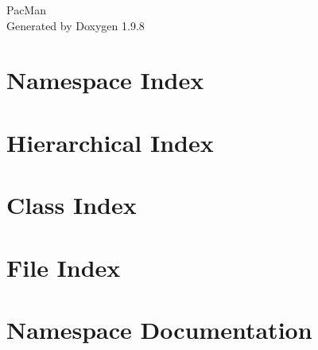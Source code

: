 \documentclass[twoside]{book}
\newcommand{\+}{\discretionary{\mbox{\scriptsize$\hookleftarrow$}}{}{}}
\newcommand{\clearemptydoublepage}{%
    \newpage{\pagestyle{empty}\cleardoublepage}%
  }
\begin{document}
  \raggedbottom
    \hypersetup{pageanchor=false,
                bookmarksnumbered=true,
                pdfencoding=unicode
               }
  \begin{titlepage}
  \vspace*{7cm}
  \begin{center}%
  {\Large Pac\+Man}\\
  \vspace*{1cm}
  {\large Generated by Doxygen 1.9.8}\\
  \end{center}
  \end{titlepage}
  \clearemptydoublepage
  \tableofcontents
  \clearemptydoublepage
  \hypersetup{pageanchor=true}
\chapter{Namespace Index}

\chapter{Hierarchical Index}

\chapter{Class Index}

\chapter{File Index}

\chapter{Namespace Documentation}






\end{document}
